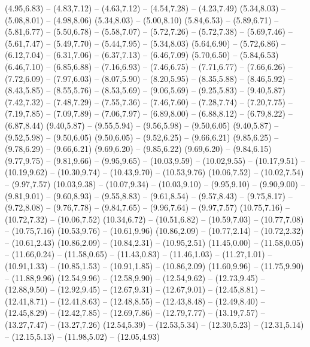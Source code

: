 \providecommand\Gewaesser[1]{\csname geo:Gewaesser:#1\endcsname}
\def\GewaesserListe{alle}
\expandafter\def\csname geo:Gewaesser:alle\endcsname{
  (4.95,6.83) -- (4.83,7.12) -- (4.63,7.12) -- (4.54,7.28) -- (4.23,7.49)
  (5.34,8.03) -- (5.08,8.01) -- (4.98,8.06)
  (5.34,8.03) -- (5.00,8.10)
  (5.84,6.53) -- (5.89,6.71) -- (5.81,6.77) -- (5.50,6.78) -- (5.58,7.07) -- (5.72,7.26) -- (5.72,7.38) -- (5.69,7.46) -- (5.61,7.47) -- (5.49,7.70) -- (5.44,7.95) -- (5.34,8.03)
  (5.64,6.90) -- (5.72,6.86) -- (6.12,7.04) -- (6.31,7.06) -- (6.37,7.13) -- (6.46,7.09)
  (5.70,6.50) -- (5.84,6.53)
  (6.46,7.10) -- (6.85,6.88) -- (7.16,6.93) -- (7.46,6.75) -- (7.71,6.77) -- (7.66,6.26) -- (7.72,6.09) -- (7.97,6.03) -- (8.07,5.90) -- (8.20,5.95) -- (8.35,5.88) -- (8.46,5.92) -- (8.43,5.85) -- (8.55,5.76) -- (8.53,5.69) -- (9.06,5.69) -- (9.25,5.83) -- (9.40,5.87)
  (7.42,7.32) -- (7.48,7.29) -- (7.55,7.36) -- (7.46,7.60) -- (7.28,7.74) -- (7.20,7.75) -- (7.19,7.85) -- (7.09,7.89) -- (7.06,7.97) -- (6.89,8.00) -- (6.88,8.12) -- (6.79,8.22) -- (6.87,8.44)
  (9.40,5.87) -- (9.55,5.94) -- (9.56,5.98) -- (9.50,6.05)
  (9.40,5.87) -- (9.52,5.98) -- (9.50,6.05)
  (9.50,6.05) -- (9.52,6.25) -- (9.66,6.21)
  (9.85,6.25) -- (9.78,6.29) -- (9.66,6.21)
  (9.69,6.20) -- (9.85,6.22)
  (9.69,6.20) -- (9.84,6.15)
  (9.77,9.75) -- (9.81,9.66) -- (9.95,9.65) -- (10.03,9.59) -- (10.02,9.55) -- (10.17,9.51) -- (10.19,9.62) -- (10.30,9.74) -- (10.43,9.70) -- (10.53,9.76)
  (10.06,7.52) -- (10.02,7.54) -- (9.97,7.57)
  (10.03,9.38) -- (10.07,9.34) -- (10.03,9.10) -- (9.95,9.10) -- (9.90,9.00) -- (9.81,9.01) -- (9.60,8.93) -- (9.55,8.83) -- (9.61,8.54) -- (9.57,8.43) -- (9.75,8.17) -- (9.72,8.08) -- (9.76,7.78) -- (9.84,7.65) -- (9.96,7.64) -- (9.97,7.57)
  (10.75,7.16) -- (10.72,7.32) -- (10.06,7.52)
  (10.34,6.72) -- (10.51,6.82) -- (10.59,7.03) -- (10.77,7.08) -- (10.75,7.16)
  (10.53,9.76) -- (10.61,9.96)
  (10.86,2.09) -- (10.77,2.14) -- (10.72,2.32) -- (10.61,2.43)
  (10.86,2.09) -- (10.84,2.31) -- (10.95,2.51)
  (11.45,0.00) -- (11.58,0.05) -- (11.66,0.24) -- (11.58,0.65) -- (11.43,0.83) -- (11.46,1.03) -- (11.27,1.01) -- (10.91,1.33) -- (10.85,1.53) -- (10.91,1.85) -- (10.86,2.09)
  (11.60,9.96) -- (11.75,9.90) -- (11.88,9.96)
  (12.54,9.96) -- (12.58,9.90) -- (12.54,9.62) -- (12.73,9.45) -- (12.88,9.50) -- (12.92,9.45) -- (12.67,9.31) -- (12.67,9.01) -- (12.45,8.81) -- (12.41,8.71) -- (12.41,8.63) -- (12.48,8.55) -- (12.43,8.48) -- (12.49,8.40) -- (12.45,8.29) -- (12.42,7.85) -- (12.69,7.86) -- (12.79,7.77) -- (13.19,7.57) -- (13.27,7.47) -- (13.27,7.26)
  (12.54,5.39) -- (12.53,5.34) -- (12.30,5.23) -- (12.31,5.14) -- (12.15,5.13) -- (11.98,5.02) -- (12.05,4.93)
}
